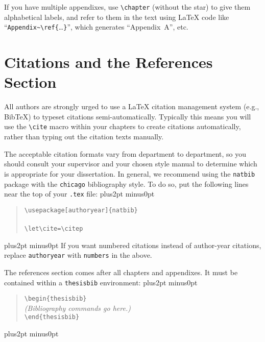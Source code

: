 \documentclass[doublespacing]{utdthesis}
\let\cite=\citep
\newenvironment{exampleclasscode}
 {\parindent=1cm\vskip0pt plus2pt minus0pt\begin{verse}}
 {\end{verse}\vskip0pt plus2pt minus0pt}
\begin{document}
If you have multiple appendixes, use \verb|\chapter| (without the star) to
give them alphabetical labels, and refer to them in the text using \LaTeX{}
code like ``\verb|Appendix~\ref{|\dots\verb|}|'', which generates
``Appendix~A'', etc.

\section{Citations and the References Section}
\label{s:references}

All authors are strongly urged to use a \LaTeX{} citation management system
(e.g., Bib\TeX) to typeset citations semi-automatically.
Typically this means you will use the \verb|\cite| macro within your chapters
to create citations automatically, rather than typing out the citation texts
manually.

The acceptable citation formats vary from department to department, so you
should consult your supervisor and your chosen style manual to determine which
is appropriate for your dissertation.
In general, we recommend using the \verb|natbib| package with the
\verb|chicago| bibliography style.
To do so, put the following lines near the top of your \verb|.tex| file:
\begin{exampleclasscode}
\verb|\usepackage[authoryear]{natbib}| \\
\verb|| \\
\verb|\let\cite=\citep|
\end{exampleclasscode}
If you want numbered citations instead of author-year citations, replace
\verb|authoryear| with \verb|numbers| in the above.

The references section comes after all chapters and appendixes.
It must be contained within a \texttt{thesisbib} environment:
\begin{exampleclasscode}
\verb|\begin{thesisbib}| \\
\textit{(Bibliography commands go here.)} \\
\verb|\end{thesisbib}|
\end{exampleclasscode}
\end{document}
